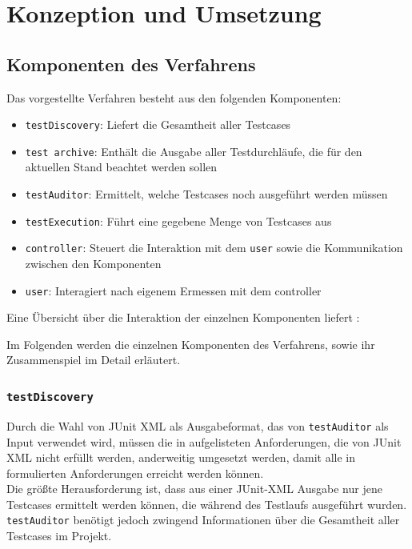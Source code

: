 \chapter{Konzeption und Umsetzung}\label{chap:approach}
\section{Komponenten des Verfahrens}\label{chap:Komponenten}
Das vorgestellte Verfahren besteht aus den folgenden Komponenten:
\begin{itemize}
    \item \texttt{testDiscovery}: Liefert die Gesamtheit aller Testcases
    \item \texttt{test archive}: Enthält die Ausgabe aller Testdurchläufe, die für den aktuellen Stand beachtet werden sollen
    \item \texttt{testAuditor}: Ermittelt, welche Testcases noch ausgeführt werden müssen
    \item \texttt{testExecution}: Führt eine gegebene Menge von Testcases aus
    \item \texttt{controller}: Steuert die Interaktion mit dem \texttt{user} sowie die Kommunikation zwischen den Komponenten
    \item \texttt{user}: Interagiert nach eigenem Ermessen mit dem controller
\end{itemize}
Eine Übersicht über die Interaktion der einzelnen Komponenten liefert :

\newpage

Im Folgenden werden die einzelnen Komponenten des Verfahrens, sowie ihr Zusammenspiel im Detail erläutert.


\subsection{\texttt{testDiscovery}}\label{chap:Komponente_testDiscovery}
Durch die Wahl von JUnit XML als Ausgabeformat, das von \texttt{testAuditor} als Input verwendet wird, müssen die in  aufgelisteten Anforderungen, die von JUnit XML nicht erfüllt werden, anderweitig umgesetzt werden, damit alle in  formulierten Anforderungen erreicht werden können.\\
Die größte Herausforderung ist, dass aus einer JUnit-XML Ausgabe nur jene Testcases ermittelt werden können, die während des Testlaufs ausgeführt wurden. \texttt{testAuditor} benötigt jedoch zwingend Informationen über die Gesamtheit aller Testcases im Projekt.


